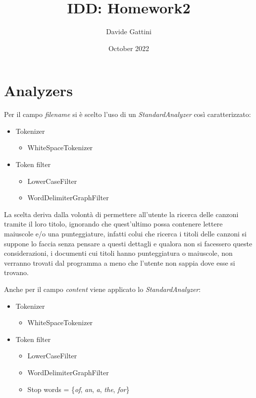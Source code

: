 \documentclass{article}
\title{IDD: Homework2}
\author{Davide Gattini}
\date{October 2022}
\begin{document}
\maketitle

\section{Analyzers}
Per il campo \textit{filename} si è scelto l'uso di un \textit{StandardAnalyzer} così caratterizzato:
\begin{itemize}
	\item Tokenizer
	\begin{itemize}
		\item WhiteSpaceTokenizer
	\end{itemize}
	\item Token filter
	\begin{itemize}
		\item LowerCaseFilter
		\item WordDelimiterGraphFilter
	\end{itemize}
\end{itemize}

La scelta deriva dalla volontà di permettere all'utente la ricerca delle canzoni tramite il loro titolo, ignorando che quest'ultimo possa contenere lettere maiuscole e/o una punteggiature, infatti colui che ricerca i titoli delle canzoni si suppone lo faccia senza pensare a questi dettagli e qualora non si facessero queste considerazioni, i documenti cui titoli hanno punteggiatura o maiuscole, non verranno trovati dal programma a meno che l'utente non sappia dove esse si trovano.

Anche per il campo \textit{content} viene applicato lo \textit{StandardAnalyzer}:
\begin{itemize}
	\item Tokenizer
	\begin{itemize}
		\item WhiteSpaceTokenizer
	\end{itemize}
	\item Token filter
	\begin{itemize}
		\item LowerCaseFilter
		\item WordDelimiterGraphFilter
		\item Stop words = \{\textit{of}, \textit{an}, \textit{a}, \textit{the}, \textit{for}\}
	\end{itemize}
\end{itemize}
\end{document}
